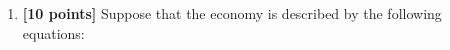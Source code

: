 




\vspace{1cm}

\renewcommand{\labelenumi}{Problem 14.\arabic{enumi}}
\begin{adjustwidth}{0.8in}{0.8in}
  \begin{enumerate}
    \item \textbf{[10 points]} Suppose that the economy is described by
          the following equations:
  \end{enumerate}
\end{adjustwidth}
